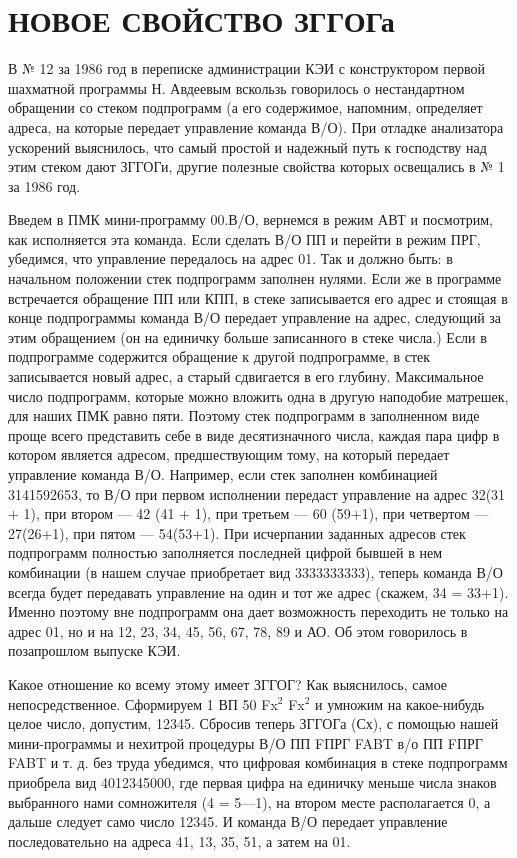 \documentclass[11pt,a4paper,oneside]{article}
\begin{document}
\section{НОВОЕ СВОЙСТВО ЗГГОГа}
В № 12 за 1986 год в переписке администрации КЭИ с конструктором первой шахматной программы Н. Авдеевым вскользь говорилось о нестандартном обращении со стеком подпрограмм (а его содержимое, напомним, определяет адреса, на которые передает управление команда В/О). При отладке анализатора ускорений выяснилось, что самый простой и надежный путь к господству над этим стеком дают ЗГГОГи, другие полезные свойства которых освещались в № 1 за 1986 год.

Введем в ПМК мини-программу 00.В/О, вернемся в режим АВТ и посмотрим, как исполняется эта команда. Если сделать В/О ПП и перейти в режим ПРГ, убедимся, что управление передалось на адрес 01. Так и должно быть: в начальном положении стек подпрограмм заполнен нулями. Если же в программе встречается обращение ПП или КПП, в стеке записывается его адрес и стоящая в конце подпрограммы команда В/О передает управление на адрес, следующий за этим обращением (он на единичку больше записанного в стеке числа.) Если в подпрограмме содержится обращение к другой подпрограмме, в стек записывается новый адрес, а старый сдвигается в его глубину. Максимальное число подпрограмм, которые можно вложить одна в другую наподобие матрешек, для наших ПМК равно пяти. Поэтому стек подпрограмм в заполненном виде проще всего представить себе в виде десятизначного числа, каждая пара цифр в котором является адресом, предшествующим тому, на который передает управление команда В/О. Например, если стек заполнен комбинацией 3141592653, то В/О при первом исполнении передаст управление на адрес 32(31 + 1), при втором — 42 (41 + 1), при третьем — 60 (59+1), при четвертом — 27(26+1), при пятом — 54(53+1). При исчерпании заданных адресов стек подпрограмм полностью заполняется последней цифрой бывшей в нем комбинации (в нашем случае приобретает вид 3333333333), теперь команда В/О всегда будет передавать управление на один и тот же адрес (скажем, 34 = 33+1). Именно поэтому вне подпрограмм она дает возможность переходить не только на адрес 01, но и на 12, 23, 34, 45, 56, 67, 78, 89 и АО. Об этом говорилось в позапрошлом выпуске КЭИ.

Какое отношение ко всему этому имеет ЗГГОГ? Как выяснилось, самое непосредственное. Сформируем 1 ВП 50 Fx$^{2}$ Fx$^{2}$ и умножим на какое-нибудь целое число, допустим, 12345. Сбросив теперь ЗГГОГа (Сх), с помощью нашей мини-программы и нехитрой процедуры В/О ПП FПРГ FABT в/о ПП FПРГ FABT и т. д. без труда убедимся, что цифровая комбинация в стеке подпрограмм приобрела вид 4012345000, где первая цифра на единичку меньше числа знаков выбранного нами сомножителя (4 = 5—1), на втором месте располагается 0, а дальше следует само число 12345. И команда В/О передает управление последовательно на адреса 41, 13, 35, 51, а затем на 01.
\end{document}
